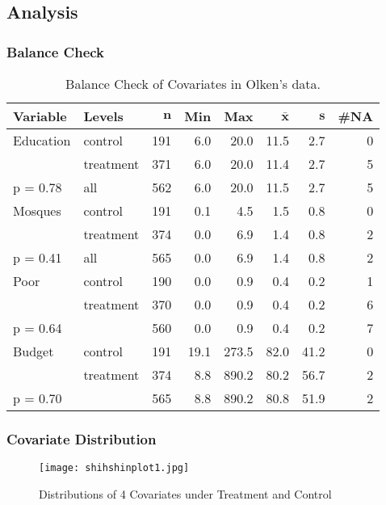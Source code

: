 \documentclass[xcolor=dvipsnames]{beamer}
\begin{document}
\subsection{Analysis}
\begin{frame}\frametitle{Balance Check}
\begin{table}[ht]
\begin{center}
{\footnotesize
\begin{tabular}{llrrrrrr}
 \textbf{Variable} & \textbf{Levels} & $\mathbf{n}$ & \textbf{Min} & \textbf{Max} & $\mathbf{\bar{x}}$ & $\mathbf{s}$ & \textbf{\#NA} \\ 
  \hline
Education & control & 191 &  6.0 &  20.0 & 11.5 &  2.7 & 0 \\ 
   & treatment & 371 &  6.0 &  20.0 & 11.4 &  2.7 & 5 \\ 
   \hline
p = 0.78 & all & 562 &  6.0 &  20.0 & 11.5 &  2.7 & 5 \\ 
   \hline
Mosques & control & 191 &  0.1 &   4.5 &  1.5 &  0.8 & 0 \\ 
   & treatment & 374 &  0.0 &   6.9 &  1.4 &  0.8 & 2 \\ 
   \hline
p = 0.41 & all & 565 &  0.0 &   6.9 &  1.4 &  0.8 & 2 \\ 
   \hline
Poor & control & 190 &  0.0 &   0.9 &  0.4 &  0.2 & 1 \\ 
   & treatment & 370 &  0.0 &   0.9 &  0.4 &  0.2 & 6 \\ 
   \hline
p = 0.64 &  & 560 &  0.0 &   0.9 &  0.4 &  0.2 & 7 \\ 
   \hline
Budget & control & 191 & 19.1 & 273.5 & 82.0 & 41.2 & 0 \\ 
   & treatment & 374 &  8.8 & 890.2 & 80.2 & 56.7 & 2 \\ 
   \hline
p = 0.70 &  & 565 &  8.8 & 890.2 & 80.8 & 51.9 & 2 \\ 
   \hline
\end{tabular}
}
\caption{Balance Check of Covariates in Olken's data.}
\label{tab: cont2}
\end{center}
\end{table}
\end{frame}

\begin{frame}\frametitle{Covariate Distribution}

\begin{figure}[h]
\texttt{[image: shihshinplot1.jpg]}
\caption{Distributions of 4 Covariates under Treatment and Control}
\end{figure}
\end{frame}
\end{document}
